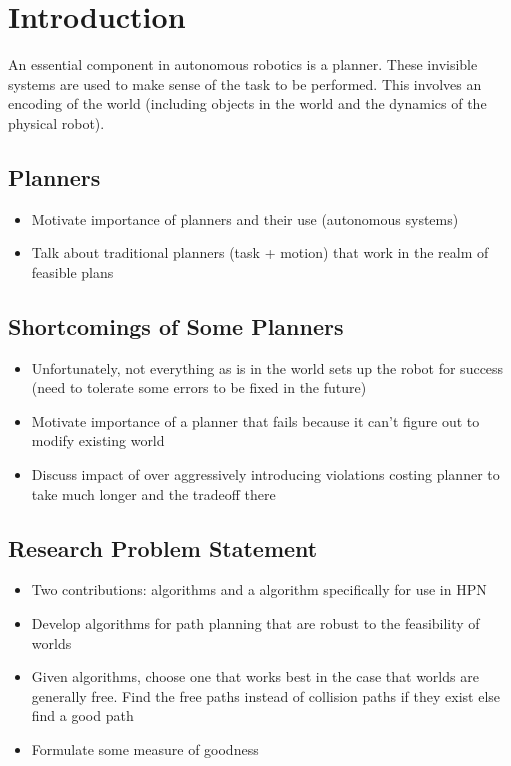 \chapter{Introduction} \label{intro}
An essential component in autonomous robotics is a planner. These invisible systems are used to make sense of the task to be performed. This involves an encoding of the world (including objects in the world and the dynamics of the physical robot). 


\section{Planners} \label{intro:planners}
\begin{itemize}
    \item Motivate importance of planners and their use (autonomous systems)
    \item Talk about traditional planners (task + motion) that work in the realm of feasible plans
\end{itemize}

\section{Shortcomings of Some Planners} \label{intro:shortcomings}
\begin{itemize}
    \item Unfortunately, not everything as is in the world sets up the robot for success (need to tolerate some errors to be fixed in the future)
    \item Motivate importance of a planner that fails because it can't figure out to modify existing world
    \item Discuss impact of over aggressively introducing violations costing planner to take much longer and the tradeoff there
\end{itemize}

\section{Research Problem Statement} \label{intro:statement}
\begin{itemize}
    \item Two contributions: algorithms and a algorithm specifically for use in HPN
    \item Develop algorithms for path planning that are robust to the feasibility of worlds
    \item Given algorithms, choose one that works best in the case that worlds are generally free. Find the free paths instead of collision paths if they exist else find a  good path
    \item Formulate some measure of goodness
\end{itemize}

